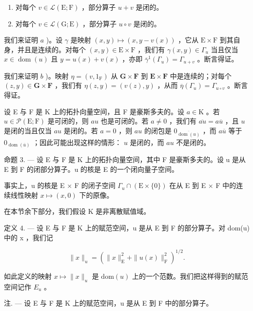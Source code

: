 \begin{enumerate}
\def\labelenumi{\alph{enumi})}
\item
  对每个 \(v \in \mathcal{L}(\mathrm{E};\mathrm{F})\) ，部分算子 \(u + v\) 是闭的。
\item
  对每个 \(v \in \mathcal{L}(\mathrm{G};\mathrm{E})\) ，部分算子 \(u \circ v\) 是闭的。
\end{enumerate}

我们来证明 \(a\) )。设 \(\gamma\) 是映射 \((x,y)\mapsto (x,y - v(x))\) ，它从 \(\mathrm{E}\times \mathrm{F}\) 到其自身，并且是连续的。对每个 \((x,y)\in \mathrm{E}\times \mathrm{F}\) ，我们有 \(\gamma (x,y)\in \Gamma_u\) 当且仅当 \(x\in \operatorname {dom}(u)\) 且 \(y = u(x) + v(x)\) ，亦即 \(\overline{\gamma}^{1}(\Gamma_{u}) = \Gamma_{u + v}\) 。断言得证。

我们来证明 \(b\) )。映射 \(\eta = (v, 1_{\mathrm{F}})\) 从 \(\mathbf{G} \times \mathbf{F}\) 到 \(\mathbf{E} \times \mathbf{F}\) 中是连续的；对每个 \((z, y) \in \mathbf{G} \times \mathbf{F}\) ，我们有 \(\eta(z, y) = (v(z), y)\) ，从而 \(\overline{\eta}(\Gamma_u) = \Gamma_{u \circ v}\) 。断言得证。

设 E 与 F 是 K 上的拓扑向量空间，且 F 是豪斯多夫的。设 \(a \in \mathrm{K}\) 。若 \(u \in \mathcal{P}(\mathrm{E};\mathrm{F})\) 是可闭的，则 \(au\) 也是可闭的。若 \(a \neq 0\) ，我们有 \(\overline{au} = a\overline{u}\) ，且 \(u\) 是闭的当且仅当 \(au\) 是闭的。若 \(a = 0\) ，则 \(au\) 的闭包是 \(0_{\overline{\operatorname{dom}(u)}}\) ，而 \(a\overline{u}\) 等于 \(0_{\operatorname{dom}(\overline{u})}\) ；因此可能出现这样的情形： \(u\) 是闭的，而 \(au\) 不是闭的。

命题 3. --- 设 E 与 F 是 K 上的拓扑向量空间，其中 F 是豪斯多夫的。设 u 是从 E 到 F 的闭部分算子。u 的核是 E 的一个闭向量子空间。

事实上，u 的核是 E × F 的闭子空间 \(\Gamma_{u} \cap (\mathrm{E} \times \{0\})\) 在从 E 到 E × F 中的连续线性映射 \(x \mapsto (x, 0)\) 下的原像。

在本节余下部分，我们假设 K 是非离散赋值域。

定义 4. --- 设 E 与 F 是 K 上的赋范空间，u 是从 E 到 F 的部分算子。对 dom(u) 中的 x ，我们记

\[
\| x \| _ {u} = (\| x \| _ {\mathrm{E}} ^ {2} + \| u (x) \| _ {\mathrm{F}} ^ {2}) ^ {1 / 2}.
\]

如此定义的映射 \(x \mapsto \|x\|_{u}\) 是 \(\text{dom}(u)\) 上的一个范数。我们把这样得到的赋范空间记作 \(E_{u}\) 。

注. --- 设 E 与 F 是 K 上的赋范空间，u 是从 E 到 F 中的部分算子。


